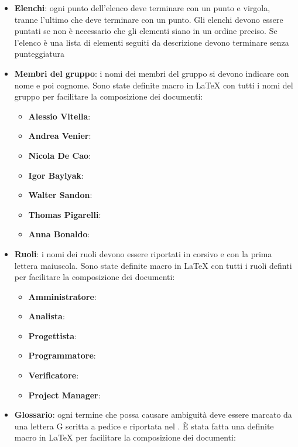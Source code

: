 \documentclass[12pt,a4paper]{article}
\begin{document}
\begin{itemize}
  \item \textbf{Elenchi}: ogni punto dell'elenco deve terminare con un punto e virgola, tranne l'ultimo che deve terminare con un punto. Gli elenchi devono essere puntati se non è necessario che gli elementi siano in un ordine preciso. Se l'elenco è una lista di elementi seguiti da descrizione devono terminare senza punteggiatura
  \item \textbf{Membri del gruppo}: i nomi dei membri del gruppo si devono indicare con nome e poi cognome. Sono state definite macro in \LaTeX{} con tutti i nomi del gruppo per facilitare la composizione dei documenti:
  \begin{itemize}
    \item \textbf{Alessio Vitella}: 
    \item \textbf{Andrea Venier}: 
    \item \textbf{Nicola De Cao}: 
    \item \textbf{Igor Baylyak}: 
    \item \textbf{Walter Sandon}: 
    \item \textbf{Thomas Pigarelli}: 
    \item \textbf{Anna Bonaldo}: 
  \end{itemize}
  \item \textbf{Ruoli}: i nomi dei ruoli devono essere riportati in corsivo e con la prima lettera maiuscola. Sono state definite macro in \LaTeX{} con tutti i ruoli definti per facilitare la composizione dei documenti:
  \begin{itemize}
    \item \textbf{Amministratore}: 
    \item \textbf{Analista}: 
    \item \textbf{Progettista}: 
    \item \textbf{Programmatore}: 
    \item \textbf{Verificatore}: 
    \item \textbf{Project Manager}: 
  \end{itemize}
  \item \textbf{Glossario}: ogni termine che possa causare ambiguità deve essere marcato da una lettera G scritta a pedice e riportata nel \GlO. È stata fatta una definite macro in \LaTeX{} per facilitare la composizione dei documenti: 

\end{itemize}
\end{document}
